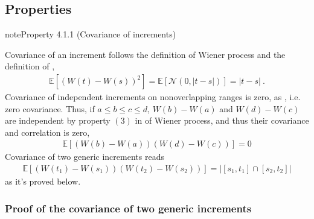 \documentclass[letterpaper,10pt,english]{jupyterBook}
\begin{document}
\subsection{Properties}
\label{\detokenize{ch/prob/wiener:properties}}\label{ch/prob/wiener:property-1}
\begin{sphinxadmonition}{note}{Property 4.1.1 (Covariance of increments)}



\sphinxAtStartPar
Covariance of an increment follows the definition of Wiener process and the definition of {\hyperref[\detokenize{ch/prob/rv-continuous:prob-rv-continuous-ex-normal}]{}},
\begin{equation}\label{equation:ch/prob/wiener:eq:wiener:cov:1}
\begin{split}\mathbb{E}\left[ \left( W(t) - W(s) \right)^2  \right] = \mathbb{E}\left[ \mathscr{N}(0, |t-s|) \right] =  |t - s| \ .\end{split}
\end{equation}
\sphinxAtStartPar
Covariance of independent increments \sphinxhyphen{} on non\sphinxhyphen{}overlapping ranges \sphinxhyphen{} is zero, as {\hyperref[\detokenize{ch/prob/rv-multi-dimensional:prob-multidim-independence-no-correlation}]{}}, i.e. zero covariance. Thus, if \(a \le b \le c \le d\), \(W(b)-W(a)\) and \(W(d)-W(c)\) are independent by property \((3)\) in {\hyperref[\detokenize{ch/prob/wiener:wiener:def}]{}} of Wiener process, and thus their covariance \sphinxhyphen{} and correlation \sphinxhyphen{} is zero,
\begin{equation}\label{equation:ch/prob/wiener:eq:wiener:cov:2}
\begin{split}\mathbb{E}\left[ ( W(b) - W(a) ) ( W(d) - W(c) )  \right] = 0\end{split}
\end{equation}
\sphinxAtStartPar
Covariance of two generic increments reads
\begin{equation}\label{equation:ch/prob/wiener:eq:wiener:cov:3}
\begin{split}\mathbb{E}\left[ \left( W(t_1) - W(s_1) \right)  \left( W(t_2) - W(s_2) \right) \right] = \big| [s_1, t_1] \cap [s_2, t_2]\big|\end{split}
\end{equation}
\sphinxAtStartPar
as it’s proved below.
\end{sphinxadmonition}
\subsubsection*{Proof of the covariance of two generic increments }
\end{document}

